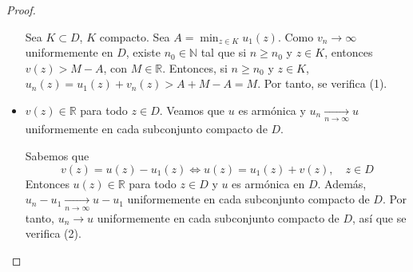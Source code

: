\begin{proof}
\begin{itemize}
              Sea $K \subset D$, $K$ compacto.
              Sea $A = \min_{z \in K} u_1(z)$.
              Como $v_n \to \infty$ uniformemente en $D$, existe $n_0 \in \mathbb{N}$ tal que si $n \geq n_0$ y $z \in K$, entonces $v(z) > M-A$, con $M \in \mathbb{R}$.
              Entonces, si $n \geq n_0$ y $z \in K$, $u_n(z) = u_1(z) + v_n(z) > A + M - A = M$.
              Por tanto, se verifica (1).

        \item $v(z) \in \mathbb{R}$ para todo $z \in D$.
              Veamos que $u$ es armónica y $u_n \xrightarrow[n \to \infty]{} u$ uniformemente en cada subconjunto compacto de $D$.

              Sabemos que
              $$v(z) = u(z) - u_1(z) \Leftrightarrow u(z) = u_1(z) + v(z), \quad z \in D$$
              Entonces $u(z) \in \mathbb{R}$ para todo $z \in D$ y $u$ es armónica en $D$.
              Además, $u_n - u_1 \xrightarrow[n \to \infty]{} u-u_1$ uniformemente en cada subconjunto compacto de $D$.
              Por tanto, $u_n \to u$ uniformemente en cada subconjunto compacto de $D$, así que se verifica (2).
    \end{itemize}
\end{proof}